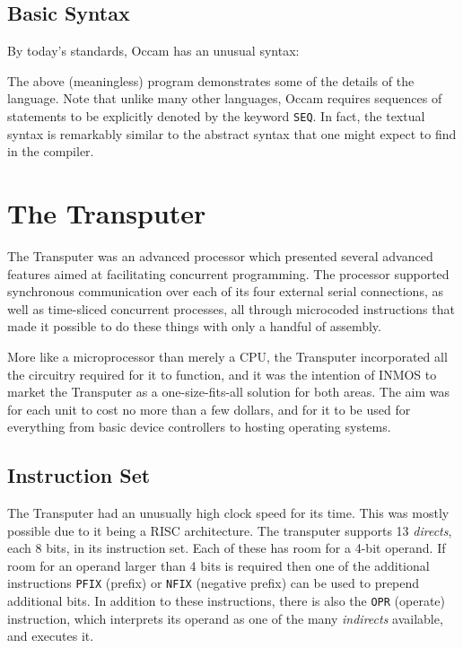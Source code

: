\subsection{Basic Syntax}

By today's standards, Occam has an unusual syntax:



The above (meaningless) program demonstrates some of the details of the
language. Note that unlike many other languages, Occam requires sequences of
statements to be explicitly denoted by the keyword \texttt{SEQ}. In fact, the
textual syntax is remarkably similar to the abstract syntax that one might
expect to find in the compiler.

\section{The Transputer} \label{transputer}

The Transputer was an advanced processor which presented several advanced
features aimed at facilitating concurrent programming. The processor supported
synchronous communication over each of its four external serial connections, as
well as time-sliced concurrent processes, all through microcoded instructions
that made it possible to do these things with only a handful of assembly.

More like a microprocessor than merely a CPU, the Transputer incorporated all
the circuitry required for it to function, and it was the intention of INMOS to
market the Transputer as a one-size-fits-all solution for both areas. The aim
was for each unit to cost no more than a few dollars, and for it to be used for
everything from basic device controllers to hosting operating systems.

\subsection{Instruction Set} \label{ops}

The Transputer had an unusually high clock speed for its time. This was mostly
possible due to it being a RISC architecture. The transputer supports 13
\textit{\gls{direct}s}, each 8 bits, in its instruction set. Each of these
has room for a 4-bit operand. If room for an operand larger than 4 bits is
required then one of the additional instructions \texttt{PFIX} (prefix) or
\texttt{NFIX} (negative prefix) can be used to prepend additional bits. In
addition to these instructions, there is also the \texttt{OPR} (operate)
instruction, which interprets its operand as one of the many
\textit{\gls{indirect}s} available, and executes it.

